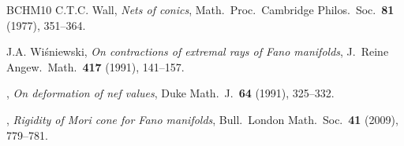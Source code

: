 \documentclass[a4paper,12pt]{amsart}
\theoremstyle{definition}
\numberwithin{figure}{section}
\numberwithin{table}{section}
\begin{document}
\begin{thebibliography}{BCHM10}
C.T.C. Wall, \emph{Nets of conics}, Math.\ Proc.\ Cambridge Philos.\ Soc.\
  \textbf{81} (1977), 351--364.

J.A. Wi{\'s}niewski, \emph{On contractions of extremal rays of {F}ano
  manifolds}, J.~Reine Angew.~Math.\ \textbf{417} (1991), 141--157.

\bysame, \emph{On deformation of nef values}, Duke Math.\ J.\ \textbf{64}
  (1991), 325--332.

\bysame, \emph{Rigidity of {M}ori cone for {F}ano manifolds}, Bull.\ London
  Math.\ Soc.\ \textbf{41} (2009), 779--781.

\end{thebibliography}


%
%
\end{document}
